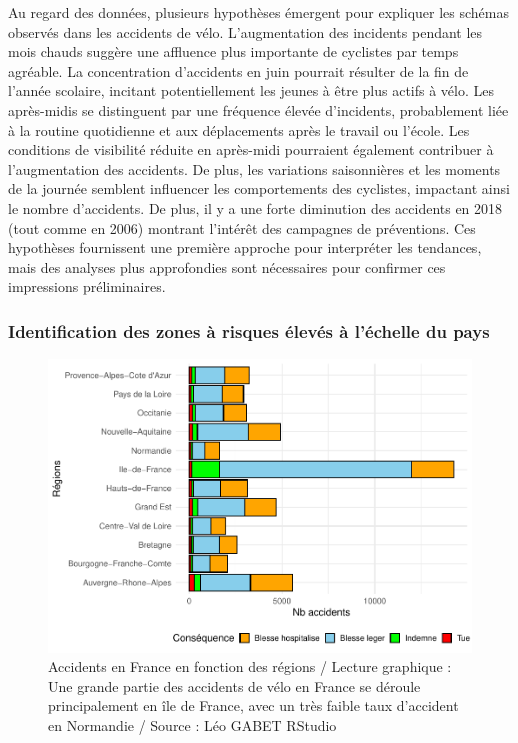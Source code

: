 \documentclass[french,]{compterendu}
\theoremstyle{urcastyle}
\theoremstyle{remark}
\begin{document}
Au regard des données, plusieurs hypothèses émergent pour expliquer les schémas observés dans les accidents de vélo. L'augmentation des incidents pendant les mois chauds suggère une affluence plus importante de cyclistes par temps agréable. La concentration d'accidents en juin pourrait résulter de la fin de l'année scolaire, incitant potentiellement les jeunes à être plus actifs à vélo. Les après-midis se distinguent par une fréquence élevée d'incidents, probablement liée à la routine quotidienne et aux déplacements après le travail ou l'école. Les conditions de visibilité réduite en après-midi pourraient également contribuer à l'augmentation des accidents. De plus, les variations saisonnières et les moments de la journée semblent influencer les comportements des cyclistes, impactant ainsi le nombre d'accidents. De plus, il y a une forte diminution des accidents en 2018 (tout comme en 2006) montrant l'intérêt des campagnes de préventions. Ces hypothèses fournissent une première approche pour interpréter les tendances, mais des analyses plus approfondies sont nécessaires pour confirmer ces impressions préliminaires.

\hypertarget{identification-des-zones-uxe0-risques-uxe9levuxe9s-uxe0-luxe9chelle-du-pays}{%
\subsubsection{Identification des zones à risques élevés à l'échelle du pays}\label{identification-des-zones-uxe0-risques-uxe9levuxe9s-uxe0-luxe9chelle-du-pays}}

\begin{figure}[H]

{\centering \includegraphics[width=0.9\linewidth]{Rapport_ADD_LEO-GABET_files/figure-latex/accfranceregion-1} 

}

\caption{Accidents en France en fonction des régions / Lecture graphique : Une grande partie des accidents de vélo en France se déroule principalement en île de France, avec un très faible taux d'accident en Normandie / Source : Léo GABET RStudio}\label{fig:accfranceregion}
\end{figure}
\end{document}

